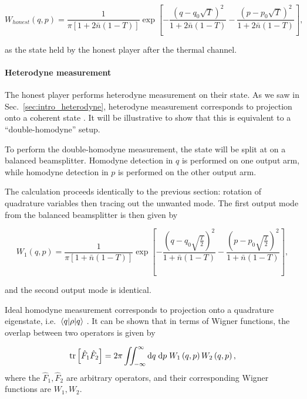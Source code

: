 \begin{equation}
W_{honest}\left(q, p\right) = \frac{1}{\pi \left[ 1 + 2 \bar{n} \left(1-T\right)\right]} \exp\left[ - \frac{\left(q - q_0 \sqrt{T}\right)^2}{1 + 2 \bar{n}\left(1-T\right)} - \frac{\left(p - p_0 \sqrt{T}\right)^2}{1 + 2 \bar{n} \left(1-T\right)} \right],
\end{equation}

\noindent as the state held by the honest player after the thermal channel.

\paragraph{Heterodyne measurement}

The honest player performs heterodyne measurement on their state. As we saw in Sec.~\ref{sec:intro_heterodyne}, heterodyne measurement corresponds to projection onto a coherent state \cite{Serafini2018, Weedbrook2012}. It will be illustrative to show that this is equivalent to a ``double-homodyne'' setup.

To perform the double-homodyne measurement, the state will be split at on a balanced beamsplitter. Homodyne detection in $q$ is performed on one output arm, while homodyne detection in $p$ is performed on the other output arm.

The calculation proceeds identically to the previous section: rotation of quadrature variables then tracing out the unwanted mode. The first output mode from the balanced beamsplitter is then given by

\begin{equation}
W_1\left(q, p\right) =  \frac{1}{\pi \left[ 1 + \bar{n}\left(1-T\right)\right]} \exp\left[- \frac{\left(q - q_0 \sqrt{\frac{T}{2}}\right)^2}{1 + \bar{n}\left(1-T\right)} - \frac{\left(p - p_0 \sqrt{\frac{T}{2}}\right)^2}{1 + \bar{n}\left(1-T\right)} \right],
\end{equation}

\noindent and the second output mode is identical.

Ideal homodyne measurement corresponds to projection onto a quadrature eigenstate, i.e. $\mel{q}{\rho}{q}$ \cite{Weedbrook2012, Serafini2017}. It can be shown \cite{Leonhardt2010} that in terms of Wigner functions, the overlap between two operators is given by

\begin{equation}
\tr\left[\hat{F}_1 \hat{F}_2 \right] = 2 \pi \iint_{-\infty}^\infty \mathrm{d}q \; \mathrm{d}p \; W_1\left(q, p\right) W_2\left(q, p\right),
\end{equation}
where the $\hat{F}_1, \hat{F}_2$ are arbitrary operators, and their corresponding Wigner functions are $W_1, W_2$.

